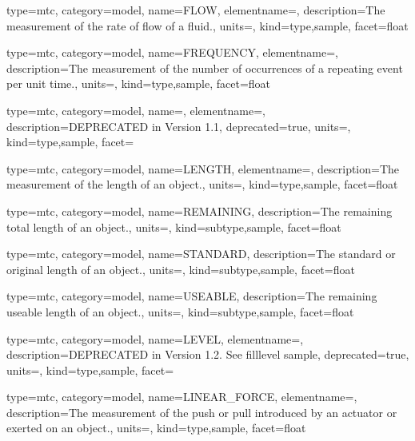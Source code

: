 {
  type=mtc,
  category=model,
  name={FLOW},
  elementname=,
  description={The measurement of the rate of flow of a fluid.},
  units=,
  kind={type,sample},
  facet={\gls{float}}
}


{
  type=mtc,
  category=model,
  name={FREQUENCY},
  elementname=,
  description={The measurement of the number of occurrences of a repeating event per unit time.},
  units=,
  kind={type,sample},
  facet={\gls{float}}
}


{
  type=mtc,
  category=model,
  name=,
  elementname=,
  description={DEPRECATED in Version 1.1},
  deprecated={true},
  units={},
  kind={type,sample},
  facet={}
}


{
  type=mtc,
  category=model,
  name={LENGTH},
  elementname=,
  description={The measurement of the length of an object.},
  units=,
  kind={type,sample},
  facet={\gls{float}}
}


{
  type=mtc,
  category=model,
  name={REMAINING},
  description={The remaining total length of an object.},
  units=,
  kind={subtype,sample},
  facet={\gls{float}}
}


{
  type=mtc,
  category=model,
  name={STANDARD},
  description={The standard or original length of an object.},
  units=,
  kind={subtype,sample},
  facet={\gls{float}}
}


{
  type=mtc,
  category=model,
  name={USEABLE},
  description={The remaining useable length of an object.},
  units=,
  kind={subtype,sample},
  facet={\gls{float}}
}


{
  type=mtc,
  category=model,
  name={LEVEL},
  elementname=,
  description={DEPRECATED in Version 1.2.  See \gls{filllevel sample}},
  deprecated={true},
  units={},
  kind={type,sample},
  facet={}
}


{
  type=mtc,
  category=model,
  name={LINEAR\_FORCE},
  elementname=,
  description={The measurement of the push or pull introduced by an actuator or exerted on an object.},
  units=,
  kind={type,sample},
  facet={\gls{float}}
}


